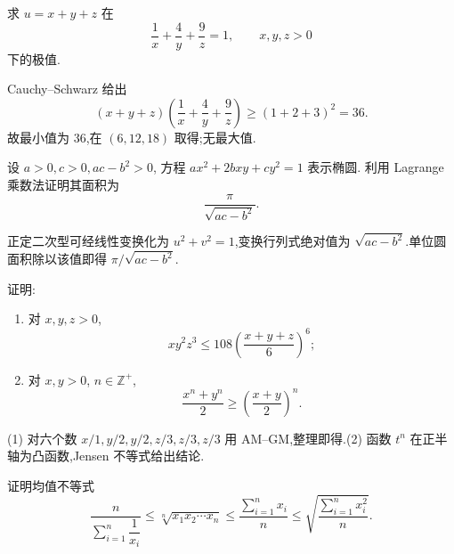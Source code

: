 \begin{example}
    求 $u=x+y+z$ 在
    \[
        \dfrac{1}{x}+\dfrac{4}{y}+\dfrac{9}{z}=1,
        \qquad x,y,z>0
    \]
    下的极值.
\end{example}
\exampleblank

\begin{solution}
    Cauchy--Schwarz 给出
    \[
        (x+y+z)\left(\dfrac{1}{x}+\dfrac{4}{y}+\dfrac{9}{z}\right)\geq(1+2+3)^2=36.
    \]
    故最小值为 $36$,在 $(6,12,18)$ 取得;无最大值.
\end{solution}

\begin{example}[\markstar]
    设 $a>0,c>0,ac-b^2>0$, 方程 $ax^2+2bxy+cy^2=1$ 表示椭圆. 利用 Lagrange 乘数法证明其面积为
    \[
        \dfrac{\pi}{\sqrt{ac-b^2}}.
    \]
\end{example}
\exampleblank

\begin{solution}
    正定二次型可经线性变换化为 $u^2+v^2=1$,变换行列式绝对值为 $\sqrt{ac-b^2}$.单位圆面积除以该值即得 $\pi/\sqrt{ac-b^2}$.
\end{solution}

\begin{example}
    证明:
    \begin{enumerate}
        \item 对 $x,y,z>0$,
              \[
                  xy^2z^3\leq108\left(\dfrac{x+y+z}{6}\right)^6;
              \]
        \item 对 $x,y>0$, $n\in\mathbb{Z}^+$,
              \[
                  \dfrac{x^n+y^n}{2}\geq\left(\dfrac{x+y}{2}\right)^n.
              \]
    \end{enumerate}
\end{example}
\exampleblank

\begin{solution}

    (1) 对六个数 $x/1,y/2,y/2,z/3,z/3,z/3$ 用 AM--GM,整理即得.(2) 函数 $t^n$ 在正半轴为凸函数,Jensen 不等式给出结论.
\end{solution}

\begin{example}[\markstar]
    证明均值不等式
    \[
        \dfrac{n}{\displaystyle\sum\limits_{i=1}^n\dfrac{1}{x_i}}
        \leq\sqrt[n]{x_1x_2\cdots x_n}
        \leq\dfrac{\displaystyle\sum\limits_{i=1}^n x_i}{n}
        \leq\sqrt{\dfrac{\displaystyle\sum\limits_{i=1}^n x_i^2}{n}}.
    \]
\end{example}
\exampleblank


